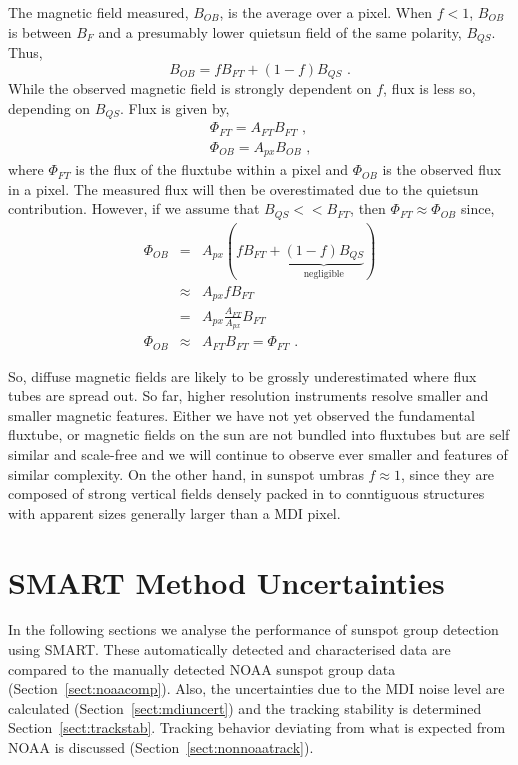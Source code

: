 The magnetic field measured, $B_{OB}$, is the average over a pixel. When $f < 1$, $B_{OB}$ is between $B_{F}$ and a presumably lower \gls{quietsun} field of the same polarity, $B_{QS}$. Thus,
\begin{equation}
B_{OB}=f B_{FT} + (1-f)B_{QS} \mbox{ .}
\end{equation}
While the observed magnetic field is strongly dependent on $f$, flux is less so, depending on $B_{QS}$. Flux is given by,
\begin{eqnarray}
\Phi_{FT} = A_{FT} B_{FT} \mbox{ ,} \\
\Phi_{OB} = A_{px} B_{OB} \mbox{ ,}
\end{eqnarray}
where $\Phi_{FT}$ is the flux of the \gls{fluxtube} within a pixel and $\Phi_{OB}$ is the observed flux in a pixel. The measured flux will then be overestimated due to the \gls{quietsun} contribution. However, if we assume that $B_{QS} << B_{FT}$, then $\Phi_{FT} \approx \Phi_{OB}$ since,
\begin{eqnarray}
\Phi_{OB} &=& A_{px} (f B_{FT} + \underbrace{(1-f)B_{QS}}_{\mbox{negligible}}) \\
 &\approx& A_{px} f B_{FT} \\
 &=& A_{px} \frac{A_{FT}}{A_{px}} B_{FT} \\
\Phi_{OB} &\approx& A_{FT} B_{FT} = \Phi_{FT} \mbox{ .}
\end{eqnarray}

So, diffuse magnetic fields are likely to be grossly underestimated where flux tubes are spread out. So far, higher resolution instruments resolve smaller and smaller magnetic features. Either we have not yet observed the fundamental \gls{fluxtube}, or magnetic fields on the sun are not bundled into \glspl{fluxtube} but are self similar and scale-free and we will continue to observe ever smaller and features of similar complexity. On the other hand, in sunspot \glspl{umbra} $f \approx 1$, since they are composed of strong vertical fields densely packed in to conntiguous structures with apparent sizes generally larger than a \gls{MDI} pixel.


\section{SMART Method Uncertainties}\label{sect:smartmethuncert}

In the following sections we analyse the performance of sunspot group detection using \gls{SMART}. These automatically detected and characterised data are compared to the manually detected \gls{NOAA} sunspot group data (Section~\ref{sect:noaacomp}). Also, the uncertainties due to the \gls{MDI} noise level are calculated (Section~\ref{sect:mdiuncert}) and the tracking stability is determined Section~\ref{sect:trackstab}. Tracking behavior deviating from what is expected from NOAA is discussed (Section~\ref{sect:nonnoaatrack}).

